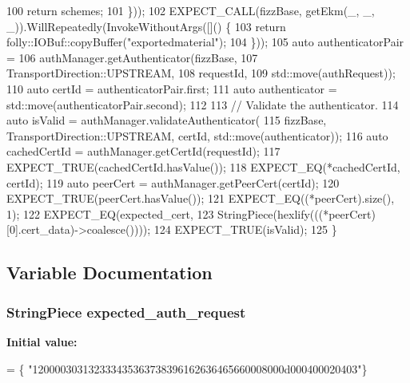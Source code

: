\begin{DoxyCode}
100         \textcolor{keywordflow}{return} schemes;
101       \}));
102   EXPECT\_CALL(fizzBase, getEkm(\_, \_, \_)).WillRepeatedly(InvokeWithoutArgs([]() \{
103     \textcolor{keywordflow}{return} folly::IOBuf::copyBuffer(\textcolor{stringliteral}{"exportedmaterial"});
104   \}));
105   \textcolor{keyword}{auto} authenticatorPair =
106       authManager.getAuthenticator(fizzBase,
107                                    TransportDirection::UPSTREAM,
108                                    requestId,
109                                    std::move(authRequest));
110   \textcolor{keyword}{auto} certId = authenticatorPair.first;
111   \textcolor{keyword}{auto} authenticator = std::move(authenticatorPair.second);
112 
113   \textcolor{comment}{// Validate the authenticator.}
114   \textcolor{keyword}{auto} isValid = authManager.validateAuthenticator(
115       fizzBase, TransportDirection::UPSTREAM, certId, std::move(authenticator));
116   \textcolor{keyword}{auto} cachedCertId = authManager.getCertId(requestId);
117   EXPECT\_TRUE(cachedCertId.hasValue());
118   EXPECT\_EQ(*cachedCertId, certId);
119   \textcolor{keyword}{auto} peerCert = authManager.getPeerCert(certId);
120   EXPECT\_TRUE(peerCert.hasValue());
121   EXPECT\_EQ((*peerCert).size(), 1);
122   EXPECT\_EQ(expected_cert,
123             StringPiece(hexlify(((*peerCert)[0].cert\_data)->coalesce())));
124   EXPECT\_TRUE(isValid);
125 \}
\end{DoxyCode}


\subsection{Variable Documentation}
\subsubsection[{expected\+\_\+auth\+\_\+request}]{\setlength{\rightskip}{0pt plus 5cm}String\+Piece expected\+\_\+auth\+\_\+request}\label{SecondaryAuthManagerTest_8cpp_afa0f2728f6e495b3ecffd73e651e09d6}
{\bfseries Initial value\+:}
\begin{DoxyCode}
= \{
    \textcolor{stringliteral}{"120000303132333435363738396162636465660008000d000400020403"}\}
\end{DoxyCode}


